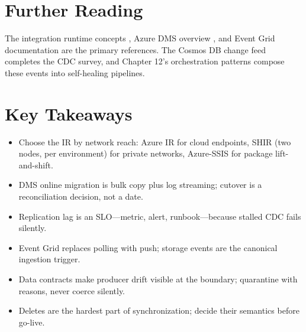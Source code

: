 \section{Further Reading}
The integration runtime concepts \cite{microsoft2025adfIR}, Azure DMS overview \cite{microsoft2025dms}, and Event Grid documentation \cite{microsoft2025eventGrid} are the primary references. The Cosmos DB change feed \cite{microsoft2025cosmosChangeFeed} completes the CDC survey, and Chapter 12's orchestration patterns compose these events into self-healing pipelines.

\section*{Key Takeaways}
\begin{itemize}
    \item Choose the IR by network reach: Azure IR for cloud endpoints, SHIR (two nodes, per environment) for private networks, Azure-SSIS for package lift-and-shift.
    \item DMS online migration is bulk copy plus log streaming; cutover is a reconciliation decision, not a date.
    \item Replication lag is an SLO---metric, alert, runbook---because stalled CDC fails silently.
    \item Event Grid replaces polling with push; storage events are the canonical ingestion trigger.
    \item Data contracts make producer drift visible at the boundary; quarantine with reasons, never coerce silently.
    \item Deletes are the hardest part of synchronization; decide their semantics before go-live.
\end{itemize}

